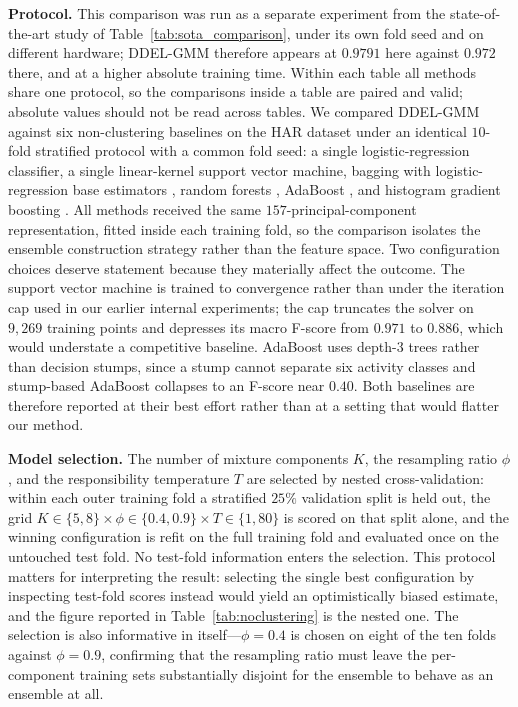 \documentclass[lettersize,journal]{IEEEtran}
\begin{document}
		\noindent \textbf{Protocol.} This comparison was run as a separate experiment from the state-of-the-art study of Table~\ref{tab:sota_comparison}, under its own fold seed and on different hardware; DDEL-GMM therefore appears at $0.9791$ here against $0.972$ there, and at a higher absolute training time. Within each table all methods share one protocol, so the comparisons inside a table are paired and valid; absolute values should not be read across tables. We compared DDEL-GMM against six non-clustering baselines on the HAR dataset under an identical $10$-fold stratified protocol with a common fold seed: a single logistic-regression classifier, a single linear-kernel support vector machine, bagging with logistic-regression base estimators \cite{breiman_bagging_1996}, random forests \cite{breiman_random_2001}, AdaBoost \cite{freund_decision-theoretic_1997}, and histogram gradient boosting \cite{friedman_greedy_2001}. All methods received the same $157$-principal-component representation, fitted inside each training fold, so the comparison isolates the ensemble construction strategy rather than the feature space. Two configuration choices deserve statement because they materially affect the outcome. The support vector machine is trained to convergence rather than under the iteration cap used in our earlier internal experiments; the cap truncates the solver on $9{,}269$ training points and depresses its macro F-score from $0.971$ to $0.886$, which would understate a competitive baseline. AdaBoost uses depth-$3$ trees rather than decision stumps, since a stump cannot separate six activity classes and stump-based AdaBoost collapses to an F-score near $0.40$. Both baselines are therefore reported at their best effort rather than at a setting that would flatter our method.

		\noindent \textbf{Model selection.} The number of mixture components $K$, the resampling ratio $\phi$, and the responsibility temperature $T$ are selected by nested cross-validation: within each outer training fold a stratified $25\%$ validation split is held out, the grid $K \in \{5,8\} \times \phi \in \{0.4,0.9\} \times T \in \{1,80\}$ is scored on that split alone, and the winning configuration is refit on the full training fold and evaluated once on the untouched test fold. No test-fold information enters the selection. This protocol matters for interpreting the result: selecting the single best configuration by inspecting test-fold scores instead would yield an optimistically biased estimate, and the figure reported in Table~\ref{tab:noclustering} is the nested one. The selection is also informative in itself---$\phi = 0.4$ is chosen on eight of the ten folds against $\phi = 0.9$, confirming that the resampling ratio must leave the per-component training sets substantially disjoint for the ensemble to behave as an ensemble at all.
		
\end{document}
